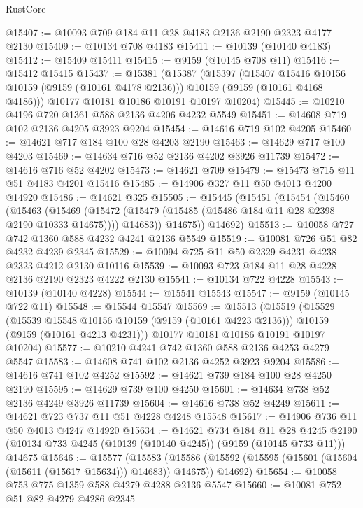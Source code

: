 \begin{lexlean}{RustCore}
\begin{coremodule}
@15407 := @10093 @709 @184 @11 @28 @4183 @2136 @2190 @2323 @4177 @2130
@15409 := @10134 @708 @4183
@15411 := @10139 (@10140 @4183)
@15412 := @15409 @15411
@15415 := @9159 (@10145 @708 @11)
@15416 := @15412 @15415
@15437 := @15381
    (@15387
      (@15397
        (@15407 @15416 @10156 @10159 (@9159 (@10161 @4178 @2136)))
        @10159
        (@9159 (@10161 @4168 @4186)))
      @10177
      @10181
      @10186
      @10191
      @10197
      @10204)
@15445 := @10210 @4196 @720 @1361 @588 @2136 @4206 @4232 @5549
@15451 := @14608 @719 @102 @2136 @4205 @3923 @9204
@15454 := @14616 @719 @102 @4205
@15460 := @14621 @717 @184 @100 @28 @4203 @2190
@15463 := @14629 @717 @100 @4203
@15469 := @14634 @716 @52 @2136 @4202 @3926 @11739
@15472 := @14616 @716 @52 @4202
@15473 := @14621 @709
@15479 := @15473 @715 @11 @51 @4183 @4201 @15416
@15485 := @14906 @327 @11 @50 @4013 @4200 @14920
@15486 := @14621 @325
@15505 := @15445
    (@15451
      (@15454
        (@15460
          (@15463
            (@15469
              (@15472 (@15479 (@15485 (@15486 @184 @11 @28 @2398 @2190 @10333 @14675))))
              @14683))
          @14675))
      @14692)
@15513 := @10058 @727 @742 @1360 @588 @4232 @4241 @2136 @5549
@15519 := @10081 @726 @51 @82 @4232 @4239 @2345
@15529 := @10094 @725 @11 @50 @2329 @4231 @4238 @2323 @4212 @2130 @10116
@15539 := @10093 @723 @184 @11 @28 @4228 @2136 @2190 @2323 @4222 @2130
@15541 := @10134 @722 @4228
@15543 := @10139 (@10140 @4228)
@15544 := @15541 @15543
@15547 := @9159 (@10145 @722 @11)
@15548 := @15544 @15547
@15569 := @15513
    (@15519
      (@15529
        (@15539 @15548 @10156 @10159 (@9159 (@10161 @4223 @2136)))
        @10159
        (@9159 (@10161 @4213 @4231)))
      @10177
      @10181
      @10186
      @10191
      @10197
      @10204)
@15577 := @10210 @4241 @742 @1360 @588 @2136 @4253 @4279 @5547
@15583 := @14608 @741 @102 @2136 @4252 @3923 @9204
@15586 := @14616 @741 @102 @4252
@15592 := @14621 @739 @184 @100 @28 @4250 @2190
@15595 := @14629 @739 @100 @4250
@15601 := @14634 @738 @52 @2136 @4249 @3926 @11739
@15604 := @14616 @738 @52 @4249
@15611 := @14621 @723 @737 @11 @51 @4228 @4248 @15548
@15617 := @14906 @736 @11 @50 @4013 @4247 @14920
@15634 := @14621
    @734
    @184
    @11
    @28
    @4245
    @2190
    (@10134 @733 @4245 (@10139 (@10140 @4245)) (@9159 (@10145 @733 @11)))
    @14675
@15646 := @15577
    (@15583
      (@15586 (@15592 (@15595 (@15601 (@15604 (@15611 (@15617 @15634))) @14683)) @14675))
      @14692)
@15654 := @10058 @753 @775 @1359 @588 @4279 @4288 @2136 @5547
@15660 := @10081 @752 @51 @82 @4279 @4286 @2345

\end{coremodule}
\end{lexlean}
